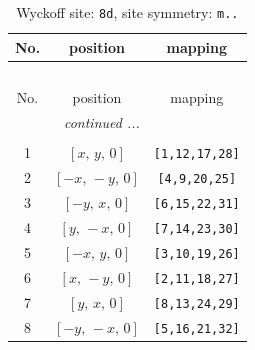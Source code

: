 \documentclass[fleqn,8pt]{jsarticle}
\begin{document}
\renewcommand{\arraystretch}{1.2}
\begin{longtable}{ccc}
\caption{Wyckoff site: {\tt 8d}, site symmetry: {\tt m..}}
 \\
 \hline \hline
No. & position & mapping \\ \hline \endfirsthead

\multicolumn{2}{l}{\tablename\ \thetable{}} \\
 \hline \hline
No. & position & mapping \\ \hline \endhead

 \hline \hline
\multicolumn{2}{r}{\footnotesize\it continued ...} \\ \endfoot

 \hline \hline
\multicolumn{2}{r}{} \\ \endlastfoot

1 & $\left[ x,\, y,\, 0 \right]$ & {\tt [1,12,17,28]} \\ \hline
2 & $\left[ - x,\, - y,\, 0 \right]$ & {\tt [4,9,20,25]} \\ \hline
3 & $\left[ - y,\, x,\, 0 \right]$ & {\tt [6,15,22,31]} \\ \hline
4 & $\left[ y,\, - x,\, 0 \right]$ & {\tt [7,14,23,30]} \\ \hline
5 & $\left[ - x,\, y,\, 0 \right]$ & {\tt [3,10,19,26]} \\ \hline
6 & $\left[ x,\, - y,\, 0 \right]$ & {\tt [2,11,18,27]} \\ \hline
7 & $\left[ y,\, x,\, 0 \right]$ & {\tt [8,13,24,29]} \\ \hline
8 & $\left[ - y,\, - x,\, 0 \right]$ & {\tt [5,16,21,32]} \\
\end{longtable}
\renewcommand{\arraystretch}{1.2}
\end{document}
